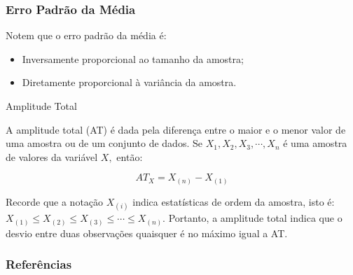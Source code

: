 \documentclass[14pt,aspectratio=1610]{beamer}
\begin{document}
\begin{frame}{}
\frametitle{Erro Padrão da Média}
    \begin{block}{}
    Notem que o erro padrão da média é:
\begin{itemize}
    \item Inversamente proporcional ao tamanho da amostra;
    \item Diretamente proporcional à variância da amostra.
\end{itemize}
    \end{block}
\end{frame}

\begin{frame}{Amplitude Total}
\begin{block}{}
\justifying
A amplitude total (AT) é dada pela diferença entre o maior e o menor valor de uma amostra ou de um conjunto de dados. Se $X_1, X_2, X_3, \cdots , X_n$ é uma amostra de valores da variável $X,$ então:

$$AT_X = X_{(n)} - X_{(1)}$$

Recorde que a notação $X_{(i)}$ indica estatísticas de ordem da amostra, isto é: $X_{(1)} \leq X_{(2)} \leq X_{(3)} \leq \cdots \leq X_{(n)}.$ Portanto, a amplitude total indica que o desvio entre duas observações quaisquer é no máximo igual a AT.
\end{block}
\nocite{Apostila}
\end{frame}



\begin{frame}%
\frametitle{\bf Referências}
\printbibliography
\end{frame}
\end{document}
